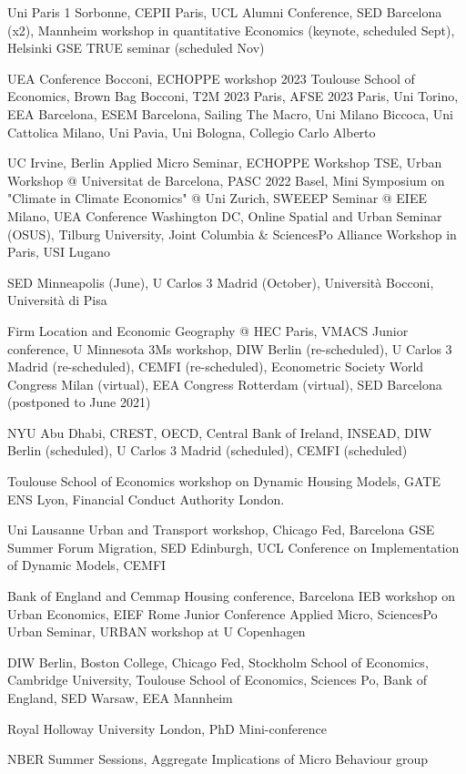 \documentclass[letterpaper]{article}
\renewenvironment{itemize}{
  \begin{list}{}{
    \setlength{\leftmargin}{1.5em}
  }
}{
  \end{list}
}
\begin{document}
\begin{itemize}
\item[2024:] Uni Paris 1 Sorbonne, CEPII Paris, UCL Alumni Conference, SED Barcelona (x2), Mannheim workshop in quantitative Economics (keynote, scheduled Sept), Helsinki GSE TRUE seminar (scheduled Nov)
\item[2023:] UEA Conference Bocconi, ECHOPPE workshop 2023 Toulouse School of Economics, Brown Bag Bocconi, T2M 2023 Paris, AFSE 2023 Paris, Uni Torino, EEA Barcelona, ESEM Barcelona, Sailing The Macro, Uni Milano Biccoca, Uni Cattolica Milano, Uni Pavia, Uni Bologna, Collegio Carlo Alberto 
\item[2022:] UC Irvine, Berlin Applied Micro Seminar, ECHOPPE Workshop TSE, Urban Workshop @ Universitat de Barcelona, PASC 2022 Basel, Mini Symposium on "Climate in Climate Economics" @ Uni Zurich, SWEEEP Seminar @ EIEE Milano, UEA Conference Washington DC, Online Spatial and Urban Seminar (OSUS), Tilburg University, Joint Columbia \& SciencesPo Alliance Workshop in Paris, USI Lugano    
\item[2021:] SED Minneapolis (June), U Carlos 3 Madrid (October), Università Bocconi, Università di Pisa
\item[2020:] Firm Location and Economic Geography @ HEC Paris, VMACS Junior conference, U Minnesota 3Ms workshop, DIW Berlin (re-scheduled), U Carlos 3 Madrid (re-scheduled), CEMFI (re-scheduled), Econometric Society World Congress Milan (virtual), EEA Congress Rotterdam (virtual), SED Barcelona (postponed to June 2021)
\item[2019:] NYU Abu Dhabi, CREST, OECD, Central Bank of Ireland, INSEAD, DIW Berlin (scheduled), U Carlos 3 Madrid (scheduled), CEMFI (scheduled)
\item[2018:] Toulouse School of Economics workshop on Dynamic Housing Models, GATE ENS Lyon, Financial Conduct Authority London.
\item[2017:] Uni Lausanne Urban and Transport workshop, Chicago Fed, Barcelona GSE Summer Forum Migration, SED Edinburgh, UCL Conference on Implementation of Dynamic Models, CEMFI
\item[2016:] Bank of England and Cemmap Housing conference, Barcelona IEB workshop on Urban Economics, EIEF Rome Junior Conference Applied Micro, SciencesPo Urban Seminar, URBAN workshop at U Copenhagen
\item[2015:] DIW Berlin, Boston College, Chicago Fed, Stockholm School of Economics, Cambridge University, Toulouse School of Economics, Sciences Po, Bank of England, SED Warsaw, EEA Mannheim
\item[2014:] Royal Holloway University London, PhD Mini-conference
\item[2013:] NBER Summer Sessions, Aggregate Implications of Micro Behaviour group
\end{itemize}
\end{document}
